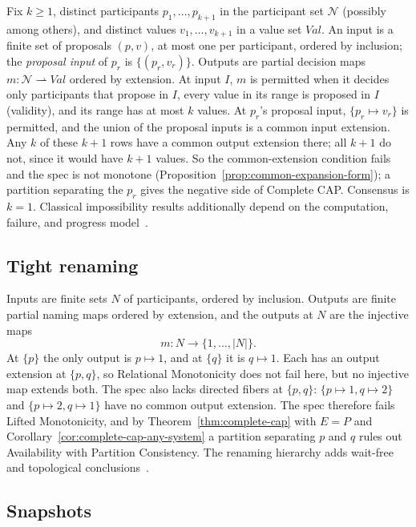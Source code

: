 \documentclass[sigconf]{cidr-2027}
\theoremstyle{remark}
\newcommand{\indesc}{input extension\xspace} %
\newcommand{\outnoun}{output extension\xspace}%
\begin{document}
\color{blue!70!black}Fix $k\geq1$, distinct participants $p_1,\ldots,p_{k+1}$ in the participant set $\mathcal N$
(possibly among others), and distinct values $v_1,\ldots,v_{k+1}$ in a value
set $\mathit{Val}$.  An input is a finite set of proposals $(p,v)$, at most one
per participant, ordered by inclusion; the \emph{proposal input} of $p_r$ is
$\{(p_r,v_r)\}$.  Outputs are partial decision maps
$m:\mathcal N\rightharpoonup\mathit{Val}$ ordered by extension.  At input $I$, $m$ is
permitted when it decides only participants that propose in $I$, every value
in its range is proposed in $I$ (validity), and its range has at most $k$
values.  At $p_r$'s proposal input, $\{p_r\mapsto v_r\}$ is permitted, and the
union of the proposal inputs is a common \indesc.  Any $k$ of these $k+1$
rows have a common \outnoun there; all $k+1$ do not, since it would have
$k+1$ values.  So the common-extension condition fails and the spec
is not monotone (Proposition~\ref{prop:common-expansion-form}); a partition
separating the $p_r$ gives the negative side of Complete CAP.  Consensus is
$k=1$.  Classical impossibility results additionally depend on the
computation, failure, and progress model~\cite{saks2000set}.\color{black}

\subsection{Tight renaming}

\color{blue!70!black}Inputs are finite sets $N$ of participants, ordered by inclusion.  Outputs are
finite partial naming maps ordered by extension, and the outputs at $N$ are
the injective maps
\begin{equation}
  m:N\longrightarrow\{1,\ldots,|N|\}.
  \label{eq:tight-renaming}
\end{equation}
At $\{p\}$ the only output is $p\mapsto1$, and at $\{q\}$ it is $q\mapsto1$.
Each has an \outnoun at $\{p,q\}$, so Relational Monotonicity does not fail
here, but no injective map extends both.  The spec also lacks directed
fibers at
$\{p,q\}$: $\{p\mapsto1,q\mapsto2\}$ and $\{p\mapsto2,q\mapsto1\}$ have no
common \outnoun.  The spec therefore fails Lifted Monotonicity, and
by Theorem~\ref{thm:complete-cap} with $E=P$ and Corollary~\ref{cor:complete-cap-any-system} a partition separating $p$ and $q$ rules out
Availability with Partition Consistency.  The renaming hierarchy adds
wait-free and topological
conclusions~\cite{herlihy1991waitfree,herlihy1999topological}.\color{black}

\subsection{Snapshots}
\end{document}
